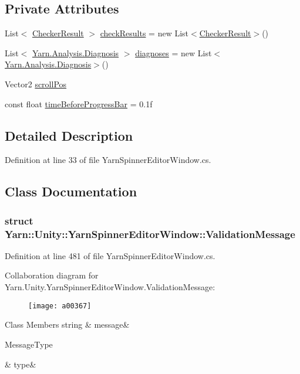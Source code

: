 \subsection*{Private Attributes}
\begin{DoxyCompactItemize}
\item 
List$<$ \hyperlink{a00039}{Checker\-Result} $>$ \hyperlink{a00176_aa85ab7bd194e5425b991b9c216d4d10e}{check\-Results} = new List$<$\hyperlink{a00039}{Checker\-Result}$>$()
\item 
List$<$ \hyperlink{a00081}{Yarn.\-Analysis.\-Diagnosis} $>$ \hyperlink{a00176_a25c92cbfdd09661a96714d05b14af886}{diagnoses} = new List$<$\hyperlink{a00081}{Yarn.\-Analysis.\-Diagnosis}$>$()
\item 
Vector2 \hyperlink{a00176_a2d9b9702b0980af9d4202aebd440124b}{scroll\-Pos}
\item 
const float \hyperlink{a00176_a62a14b3fbaf2da41154ebad0eb7b6d3f}{time\-Before\-Progress\-Bar} = 0.\-1f
\end{DoxyCompactItemize}


\subsection{Detailed Description}


Definition at line 33 of file Yarn\-Spinner\-Editor\-Window.\-cs.



\subsection{Class Documentation}
\label{a00365}
\hypertarget{a00176_a00365}{}
\subsubsection{struct Yarn\-:\-:Unity\-:\-:Yarn\-Spinner\-Editor\-Window\-:\-:Validation\-Message}


Definition at line 481 of file Yarn\-Spinner\-Editor\-Window.\-cs.



Collaboration diagram for Yarn.\-Unity.\-Yarn\-Spinner\-Editor\-Window.\-Validation\-Message\-:
\nopagebreak
\begin{figure}[H]
\begin{center}
\leavevmode
\texttt{[image: a00367]}
\end{center}
\end{figure}
\begin{DoxyFields}{Class Members}
\hypertarget{a00176_a636dce6708e779c201fa5e7d01cf2955}{string}\label{a00176_a636dce6708e779c201fa5e7d01cf2955}
&
message&
\\
\hline

\hypertarget{a00176_a7d342190c7657fbbe85eb6fa66bcabb8}{Message\-Type}\label{a00176_a7d342190c7657fbbe85eb6fa66bcabb8}
&
type&
\\
\hline

\end{DoxyFields}


